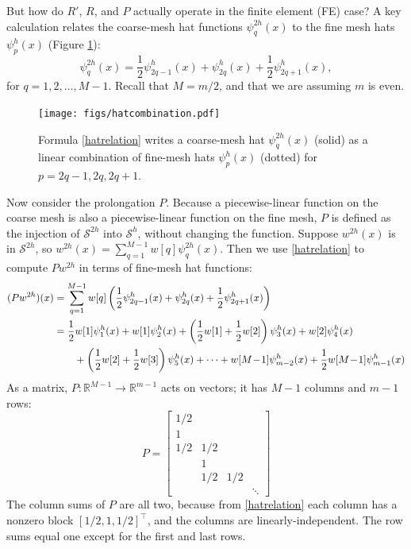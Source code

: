 \documentclass[letterpaper,final,12pt,reqno]{amsart}
\newcommand{\RR}{\mathbb{R}}
\begin{document}
But how do $R'$, $R$, and $P$ actually operate in the finite element (FE) case?  A key calculation relates the coarse-mesh hat functions $\psi_q^{2h}(x)$ to the fine mesh hats $\psi_p^h(x)$ (Figure \ref{fig:hatcombination}):
\begin{equation}
  \psi_q^{2h}(x) = \frac{1}{2} \psi_{2q-1}^h(x) + \psi_{2q}^h(x) + \frac{1}{2} \psi_{2q+1}^h(x), \label{hatrelation}
\end{equation}
for $q=1,2,\dots,M-1$.  Recall that $M=m/2$, and that we are assuming $m$ is even.

\begin{figure}
\texttt{[image: figs/hatcombination.pdf]}
\caption{Formula \eqref{hatrelation} writes a coarse-mesh hat $\psi_q^{2h}(x)$ (solid) as a linear combination of fine-mesh hats $\psi_p^h(x)$ (dotted) for $p=2q-1,2q,2q+1$.}
\label{fig:hatcombination}
\end{figure}

Now consider the prolongation $P$.  Because a piecewise-linear function on the coarse mesh is also a piecewise-linear function on the fine mesh, $P$ is defined as the injection of $\mathcal{S}^{2h}$ into $\mathcal{S}^h$, without changing the function.  Suppose $w^{2h}(x)$ is in $\mathcal{S}^{2h}$, so $w^{2h}(x) = \sum_{q=1}^{M-1} w[q] \psi_q^{2h}(x)$.  Then we use \eqref{hatrelation} to compute $P w^{2h}$ in terms of fine-mesh hat functions:
\begin{align}
(P w^{2h})(x) &= \sum_{q=1}^{M-1} w[q] \left(\frac{1}{2} \psi_{2q-1}^h(x) + \psi_{2q}^h(x) + \frac{1}{2} \psi_{2q+1}^h(x)\right) \label{pformula} \\
              &= \frac{1}{2} w[1] \psi_1^h(x) + w[1] \psi_2^h(x) + \left(\frac{1}{2} w[1] + \frac{1}{2} w[2]\right) \psi_3^h(x) + w[2] \psi_4^h(x) \notag \\
              &\qquad + \left(\frac{1}{2} w[2] + \frac{1}{2} w[3]\right) \psi_5^h(x) + \dots + w[M\!-\!1] \psi_{m-2}^h(x) + \frac{1}{2} w[M\!-\!1] \psi_{m-1}^h(x) \notag
\end{align}
As a matrix, $P:\RR^{M-1} \to \RR^{m-1}$ acts on vectors; it has $M-1$ columns and $m-1$ rows:
\begin{equation}
P = \begin{bmatrix}
1/2 & & & \\
1 & & & \\
1/2 & 1/2 & & \\
 & 1 & & \\
 & 1/2 & 1/2 & \\
 & & & \ddots
\end{bmatrix} \label{pmatrix}
\end{equation}
The column sums of $P$ are all two, because from \eqref{hatrelation} each column has a nonzero block $[1/2,1,1/2]^\top$, and the columns are linearly-independent.  The row sums equal one except for the first and last rows.
\end{document}
